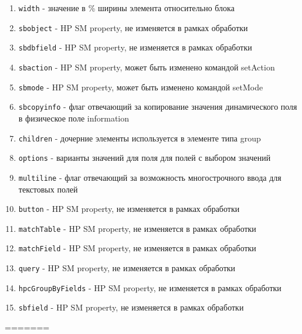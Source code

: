 \documentclass[../index.tex]{subfiles}
\begin{document}
\begin{enumerate}
    \item \verb|width| - значение в \% ширины элемента относительно блока
    \item \verb|sbobject| - HP SM property, не изменяется в рамках обработки
    \item \verb|sbdbfield| - HP SM property, не изменяется в рамках обработки
    \item \verb|sbaction| - HP SM property, может быть изменено командой setAction
    \item \verb|sbmode| - HP SM property, может быть изменено командой setMode
    \item \verb|sbcopyinfo| - флаг отвечающий за копирование значения динамического поля в физическое поле information 
    \item \verb|children| - дочерние элементы используется в элементе типа group
    \item \verb|options| - варианты значений для поля для полей с выбором значений
    \item \verb|multiline| - флаг отвечающий за возможность многострочного ввода для текстовых полей
    \item \verb|button| - HP SM property, не изменяется в рамках обработки
    \item \verb|matchTable| - HP SM property, не изменяется в рамках обработки
    \item \verb|matchField| - HP SM property, не изменяется в рамках обработки
    \item \verb|query| - HP SM property, не изменяется в рамках обработки
    \item \verb|hpcGroupByFields| - HP SM property, не изменяется в рамках обработки
    \item \verb|sbfield| - HP SM property, не изменяется в рамках обработки
\end{enumerate}
=======
\end{document}
